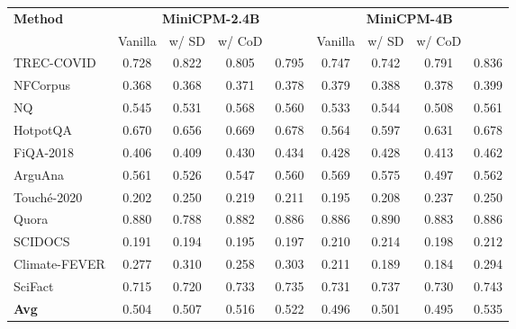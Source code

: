 \begin{table*}[h!]
    \small
    \centering
    \begin{tabular}{l|cccc|cccc}
        \hline
        \multirow{2}{*}{\textbf{Method}} & \multicolumn{4}{c|}{\textbf{MiniCPM-2.4B}} & \multicolumn{4}{c}{\textbf{MiniCPM-4B}} \\
        & Vanilla & w/ SD & w/ CoD & \method{} & Vanilla & w/ SD & w/ CoD & \method{}\\
        \hline
        TREC-COVID      & 0.728 &0.822 &0.805 &0.795 &0.747 &0.742 & 0.791&0.836 \\
        NFCorpus        & 0.368 &0.368 &0.371 &0.378 &0.379 &0.388 &0.378 &0.399 \\
        NQ              & 0.545 &0.531 &0.568 &0.560 &0.533 & 0.544      &0.508     &0.561 \\
        HotpotQA        & 0.670 &0.656 &0.669 &0.678 &0.564      &0.597      &0.631      &0.678 \\
        FiQA-2018       & 0.406 &0.409 &0.430 &0.434 &0.428 &0.428 &0.413 &0.462 \\
        ArguAna         & 0.561 &0.526 &0.547 &0.560 &0.569 &0.575 & 0.497&0.562 \\
        Touché-2020     & 0.202 &0.250 &0.219 &0.211 &0.195 &0.208 & 0.237&0.250 \\
        Quora           & 0.880 &0.788 &0.882 &0.886 &0.886 &0.890 &0.883 &0.886 \\
        SCIDOCS         & 0.191 &0.194 &0.195 &0.197 &0.210 &0.214 &0.198 &0.212 \\
        Climate-FEVER   & 0.277 &0.310 &0.258 &0.303 &0.211      &0.189      &0.184      &0.294 \\
        SciFact         & 0.715 &0.720 &0.733 &0.735 &0.731 &0.737 &0.730 &0.743 \\
        \hline
        \textbf{Avg}    &0.504 &0.507&0.516 &0.522\rlap{$^{\dagger\mathsection}$} &0.496      & 0.501      &0.495     &0.535\rlap{$^{\dagger\ddagger\mathsection}$}\\
        \hline
    \end{tabular}
    \caption{Ablation Study of \textbf{D}\textbf{e}li\textbf{b}er\textbf{a}te \textbf{T}hinking based Dens\textbf{e} \textbf{R}etriever (\method{}). We train three \method{} variations: MiniCPM w/ SD, MiniCPM w/ CoD and vanilla MiniCPM. ${\dagger}$, ${\ddagger}$, and ${\mathsection}$ indicate statistically significant improvements over MiniCPM w/ SD$^{\dagger}$, MiniCPM w/ CoD$^{\ddagger}$ and vanilla MiniCPM$^{\mathsection}$.  }
    \label{tab:ablation}
\end{table*}

